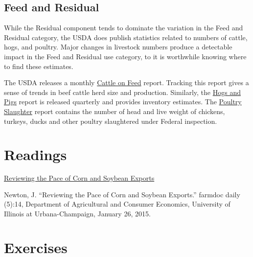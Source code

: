 \documentclass[]{book}
\theoremstyle{definition}
\theoremstyle{definition}
\theoremstyle{remark}
\begin{document}
\subsection{Feed and Residual}\label{feed-and-residual-1}

While the Residual component tends to dominate the variation in the Feed
and Residual category, the USDA does publish statistics related to
numbers of cattle, hogs, and poultry. Major changes in livestock numbers
produce a detectable impact in the Feed and Residual use category, to it
is worthwhile knowing where to find these estimates.

The USDA releases a monthly
\href{http://usda.mannlib.cornell.edu/MannUsda/viewDocumentInfo.do?documentID=1020}{Cattle
on Feed} report. Tracking this report gives a sense of trends in beef
cattle herd size and production. Similarly, the
\href{http://usda.mannlib.cornell.edu/MannUsda/viewDocumentInfo.do?documentID=1086}{Hogs
and Pigs} report is released quarterly and provides inventory estimates.
The
\href{https://usda.mannlib.cornell.edu/MannUsda/viewDocumentInfo.do?documentID=1131}{Poultry
Slaughter} report contains the number of head and live weight of
chickens, turkeys, ducks and other poultry slaughtered under Federal
inspection.

\section{Readings}\label{readings-3}

\href{http://farmdocdaily.illinois.edu/2015/01/reviewing-pace-of-corn-and-soybean-exports.html}{Reviewing
the Pace of Corn and Soybean Exports}

Newton, J. ``Reviewing the Pace of Corn and Soybean Exports.'' farmdoc
daily (5):14, Department of Agricultural and Consumer Economics,
University of Illinois at Urbana-Champaign, January 26, 2015.

\section{Exercises}\label{exercises-4}
\end{document}

